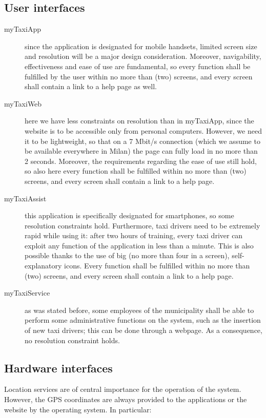 \subsection{User interfaces}

\begin{description}
	\item [myTaxiApp] since the application is designated for mobile handsets, limited screen size and resolution will be a major design consideration. Moreover, navigability, effectiveness and ease of use are fundamental, so every function shall be fulfilled by the user within no more than (two) screens, and every screen shall contain a link to a help page as well.
	\item [myTaxiWeb] here we have less constraints on resolution than in myTaxiApp, since the website is to be accessible only from personal computers. However, we need it to be lightweight, so that on a 7 Mbit/s connection (which we assume to be available everywhere in Milan) the page can fully load in no more than 2 seconds. Moreover, the requirements regarding the ease of use still hold, so also here every function shall be fulfilled within no more than (two) screens, and every screen shall contain a link to a help page.
	\item [myTaxiAssist] this application is specifically designated for smartphones, so some resolution constraints hold. Furthermore, taxi drivers need to be extremely rapid while using it: after two hours of training, every taxi driver can exploit any function of the application in less than a minute. This is also possible thanks to the use of big (no more than four in a screen), self-explanatory icons. Every function shall be fulfilled within no more than (two) screens, and every screen shall contain a link to a help page.
	\item [myTaxiService] as was stated before, some employees of the municipality shall be able to perform some administrative functions on the system, such as the insertion of new taxi drivers; this can be done through a webpage. As a consequence, no resolution constraint holds.
\end{description}




\subsection{Hardware interfaces}

Location services are of central importance for the operation of the system. However, the GPS coordinates are always provided to the applications or the website by the operating system. In particular:

